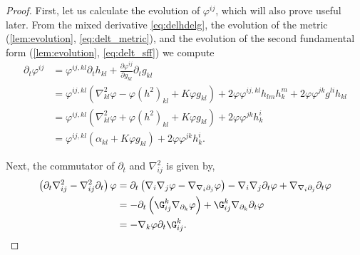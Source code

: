 \documentclass[12pt]{amsart}
\begin{document}
\begin{proof}
First, let us calculate the evolution of \(\varphi^{ij}\), which will also prove useful later. From the mixed derivative \cref{eq:delhdelg}, the evolution of the metric (\cref{lem:evolution}, \cref{eq:delt_metric}), and the evolution of the second fundamental form (\cref{lem:evolution}, \cref{eq:delt_sff}) we compute
\begin{equation}
\label{eq:deltBox}
\begin{split}
\partial_{t} \varphi^{ij} &= \varphi^{ij,kl} \partial_t h_{kl} + \frac{\partial\varphi^{ij}}{\partial g_{kl}} \partial_t g_{kl} \\
&= \varphi^{ij,kl} \left(\nabla^2_{kl} \varphi - \varphi(h^2)_{kl} + K \varphi g_{kl}\right) + 2\varphi \varphi^{ij,kl} h_{lm}h^{m}_{k} + 2\varphi\varphi^{jk}g^{li}h_{kl} \\
&= \varphi^{ij,kl} \left(\nabla^2_{kl} \varphi + \varphi(h^2)_{kl} + K \varphi g_{kl}\right) + 2\varphi\varphi^{jk}h^{i}_{k} \\
&= \varphi^{ij,kl} \left(\alpha_{kl} + K \varphi g_{kl}\right) + 2\varphi\varphi^{jk}h^{i}_{k}.
\end{split}
\end{equation}

Next, the commutator of \(\partial_t\) and \(\nabla^2_{ij}\) is given by,
\begin{equation}
\label{eq:deltnabla2}
\begin{split}
\left(\partial_{t}\nabla^2_{ij} - \nabla^2_{ij}\partial_{t}\right) \varphi &= \partial_t \left(\nabla_i \nabla_j \varphi - \nabla_{\nabla_i \partial_j} \varphi\right) - \nabla_i \nabla_j \partial_t \varphi + \nabla_{\nabla_i \partial_j} \partial_t \varphi \\
&= - \partial_t \left(\G_{ij}^k \nabla_{\partial_k} \varphi\right) + \G_{ij}^k \nabla_{\partial_k} \partial_t \varphi \\
&= - \nabla_k \varphi \partial_t \G_{ij}^k.
\end{split}
\end{equation}


\end{proof}
\end{document}
